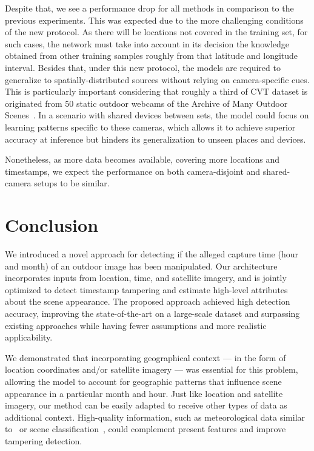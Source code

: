 \documentclass[journal]{IEEEtran}
\begin{document}
    Despite that, we see a performance drop for all methods in comparison to the previous experiments. This was expected due to the more challenging conditions of the new protocol. As there will be locations not covered in the training set, for such cases, the network must take into account in its decision the knowledge obtained from other training samples roughly from that latitude and longitude interval. Besides that, under this new protocol, the models are required to generalize to spatially-distributed sources without relying on camera-specific cues. This is particularly important considering that roughly a third of CVT dataset is originated from 50 static outdoor webcams of the Archive of Many Outdoor Scenes~\cite{jacobs2007consistent}. In a scenario with shared devices between sets, the model could focus on learning patterns specific to these cameras, which allows it to achieve superior accuracy at inference but hinders its generalization to unseen places and devices. 
    
    Nonetheless, as more data becomes available, covering more locations and timestamps, we expect the performance on both camera-disjoint and shared-camera setups to be similar.
    
    
    
  
    

\section{Conclusion}
    We introduced a novel approach for detecting if the alleged capture time (hour and month) of an outdoor image has been manipulated. Our architecture incorporates inputs from location, time, and satellite imagery, and is jointly optimized to detect timestamp tampering and estimate high-level attributes about the scene appearance. The proposed approach achieved high detection accuracy, improving the state-of-the-art on a large-scale dataset and surpassing existing approaches while having fewer assumptions and more realistic applicability. 
    
    We demonstrated that incorporating geographical context --- in the form of location coordinates and/or satellite imagery --- was essential for this problem, allowing the model to account for geographic patterns that influence scene appearance in a particular month and hour. Just like location and satellite imagery, our method can be easily adapted to receive other types of data as additional context. High-quality information, such as meteorological data similar to~\cite{ghosh2017detection} or scene classification~\cite{zhou2017places}, could complement present features and improve tampering detection.
    
\end{document}
